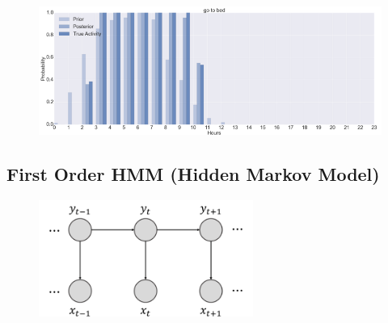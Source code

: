 \documentclass[10pt,letter]{article}
\numberwithin{equation}{section} %
\numberwithin{figure}{section} %
\numberwithin{table}{section} %
\begin{document}
\begin{figure}[h]
    \centering
    \includegraphics[width=18cm]{NB_result}
\end{figure}
\subsection{First Order HMM (Hidden Markov Model)}
\begin{figure}[h]
    \centering
\includegraphics[width=7cm]{1hmm}
\end{figure}
\end{document}
